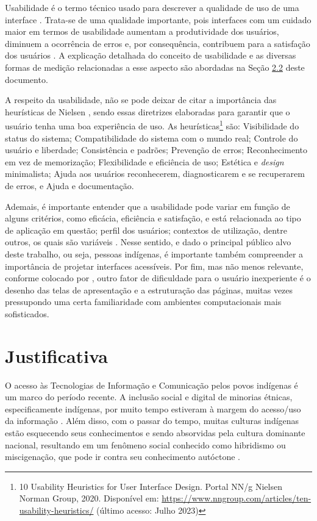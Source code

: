 Usabilidade é o termo técnico usado para descrever a qualidade de uso de uma interface \cite{bevan1995}. Trata-se de uma qualidade importante, pois interfaces com um
cuidado maior em termos de usabilidade aumentam a produtividade dos usuários, diminuem a ocorrência de erros e, por consequência, contribuem para a satisfação dos
usuários \cite{winckler2022}. A explicação detalhada do conceito de usabilidade e as diversas formas de medição relacionadas a esse aspecto são abordadas na Seção \hyperref[sec:Usabilidade]{2.2} 
deste documento.

A respeito da usabilidade, não se pode deixar de citar a importância das heurísticas de Nielsen \cite{nielsen1994}, sendo essas diretrizes elaboradas para garantir que o
usuário tenha uma boa experiência de uso. As heurísticas\footnote{10 Usability Heuristics for User Interface Design. Portal NN/g Nielsen Norman Group, 2020. Disponível
em: \url{https://www.nngroup.com/articles/ten-usability-heuristics/} (último acesso: Julho 2023)} são: Visibilidade do status do sistema; Compatibilidade do
sistema com o mundo real; Controle do usuário e liberdade; Consistência e padrões; Prevenção de erros; Reconhecimento em vez de memorização; Flexibilidade e eficiência de uso; 
Estética e \textit{design} minimalista; Ajuda aos usuários reconhecerem, diagnosticarem e se recuperarem de erros, e Ajuda e documentação.

Ademais, é importante entender que a usabilidade pode variar em função de alguns critérios, como eficácia, eficiência e satisfação, e está relacionada ao tipo de
aplicação em questão; perfil dos usuários; contextos de utilização, dentre outros, os quais são variáveis \cite{winckler2022}. Nesse sentido, e dado o principal público alvo deste
trabalho, ou seja, pessoas indígenas, é importante também compreender a importância de projetar interfaces acessíveis. Por fim, mas não menos relevante, conforme colocado 
por , outro fator de dificuldade para o usuário inexperiente é o desenho das telas de apresentação e a estruturação das páginas, muitas vezes 
pressupondo uma certa familiaridade com ambientes computacionais mais sofisticados.

\section{Justificativa}
\label{sec:Justificativa}

O acesso às Tecnologias de Informação e Comunicação pelos povos indígenas é um marco do período recente. A inclusão social e digital de minorias étnicas, especificamente
indígenas, por muito tempo estiveram à margem do acesso/uso da informação \cite{pinto2010}. Além disso, com o passar do tempo, muitas culturas indígenas estão esquecendo
seus conhecimentos e sendo absorvidas pela cultura dominante nacional, resultando em um fenômeno social conhecido como hibridismo ou miscigenação, que pode ir contra seu
conhecimento autóctone \cite{pinto2010}.

